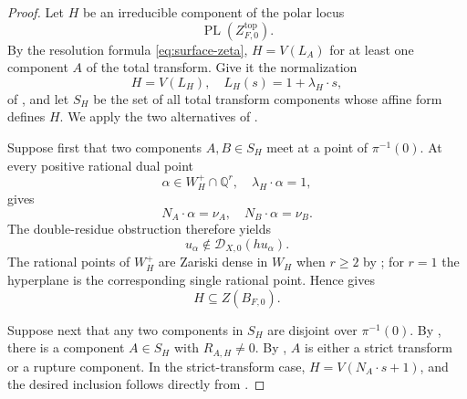 \documentclass[10pt,a4paper]{amsart}
\DeclareMathOperator{\PL}{PL}
\newcommand{\D}{\mathscr D}
\newcommand{\Q}{\mathbb Q}
\begin{document}
\begin{proof}
Let $H$ be an irreducible component of the polar locus
\begin{equation*}
\PL(Z^{\mathrm{top}}_{F,0}).
\end{equation*}
By the resolution formula \eqref{eq:surface-zeta}, $H=V(L_A)$ for at least one component $A$ of the total transform. Give it the normalization
\begin{equation*}
H=V(L_H),
 \quad
 L_H(s)=1+\lambda_H\cdot s,
\end{equation*}
of , and let $S_H$ be the set of all total transform components whose affine form defines $H$. We apply the two alternatives of .

Suppose first that two components $A,B\in S_H$ meet at a point of $\pi^{-1}(0)$. At every positive rational dual point
\begin{equation*}
\alpha\in W_H^+\cap\Q^r,
 \quad
 \lambda_H\cdot\alpha=1,
\end{equation*}
 gives
\begin{equation*}
N_A\cdot\alpha=\nu_A,
 \quad
 N_B\cdot\alpha=\nu_B.
\end{equation*}
The double-residue obstruction  therefore yields
\begin{equation*}
u_\alpha\notin\D_{X,0}(hu_\alpha).
\end{equation*}
The rational points of $W_H^+$ are Zariski dense in $W_H$ when $r\geq2$ by ; for $r=1$ the hyperplane is the corresponding single rational point. Hence  gives
\begin{equation*}
H\subseteq Z(B_{F,0}).
\end{equation*}

Suppose next that any two components in $S_H$ are disjoint over $\pi^{-1}(0)$. By , there is a component $A\in S_H$ with $R_{A,H}\neq0$. By , $A$ is either a strict transform or a rupture component. In the strict-transform case, $H=V(N_A\cdot s+1)$, and the desired inclusion follows directly from .


\end{proof}
\end{document}

